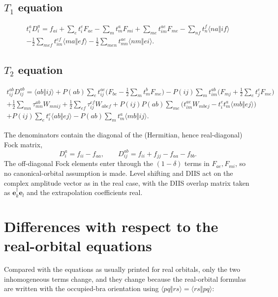 \documentclass[11pt]{article}
\newcommand{\anti}[4]{\langle #1#2\Vert #3#4\rangle}
\begin{document}
\subsection{$T_1$ equation}

\begin{multline}
t_i^a D_i^a = f_{ai}+\sum_e t_i^e F_{ae}-\sum_m t_m^a F_{mi}
+\sum_{me}t_{im}^{ae}F_{me}
-\sum_{nf}t_n^f\anti{n}{a}{i}{f}\\
-\tfrac12\sum_{mef}t_{im}^{ef}\anti{m}{a}{e}{f}
-\tfrac12\sum_{men}t_{mn}^{ae}\anti{n}{m}{e}{i}.
\end{multline}

\subsection{$T_2$ equation}

\begin{multline}
t_{ij}^{ab}D_{ij}^{ab}=\anti{a}{b}{i}{j}
+P(ab)\sum_e t_{ij}^{ae}\Big(F_{be}-\tfrac12\sum_m t_m^b F_{me}\Big)
-P(ij)\sum_m t_{im}^{ab}\Big(F_{mj}+\tfrac12\sum_e t_j^e F_{me}\Big)\\
+\tfrac12\sum_{mn}\tau_{mn}^{ab}W_{mnij}
+\tfrac12\sum_{ef}\tau_{ij}^{ef}W_{abef}
+P(ij)P(ab)\sum_{me}\Big(t_{im}^{ae}W_{mbej}-t_i^e t_m^a\anti{m}{b}{e}{j}\Big)\\
+P(ij)\sum_e t_i^e\anti{a}{b}{e}{j}
-P(ab)\sum_m t_m^a\anti{m}{b}{i}{j}.
\end{multline}

The denominators contain the diagonal of the (Hermitian, hence real-diagonal)
Fock matrix,
\begin{equation}
D_i^a=f_{ii}-f_{aa},\qquad D_{ij}^{ab}=f_{ii}+f_{jj}-f_{aa}-f_{bb}.
\end{equation}
The off-diagonal Fock elements enter through the $(1-\delta)$ terms in
$F_{ae},F_{mi}$, so no canonical-orbital assumption is made. Level shifting
and DIIS act on the complex amplitude vector as in the real case, with the
DIIS overlap matrix taken as $\mathbf e_k^\dagger\mathbf e_l$ and the
extrapolation coefficients real.

\section{Differences with respect to the real-orbital equations}

Compared with the equations as usually printed for real orbitals, only the two
inhomogeneous terms change, and they change because the real-orbital
formulas are written with the occupied-bra orientation using
$\anti{p}{q}{r}{s}=\anti{r}{s}{p}{q}$:
\end{document}

